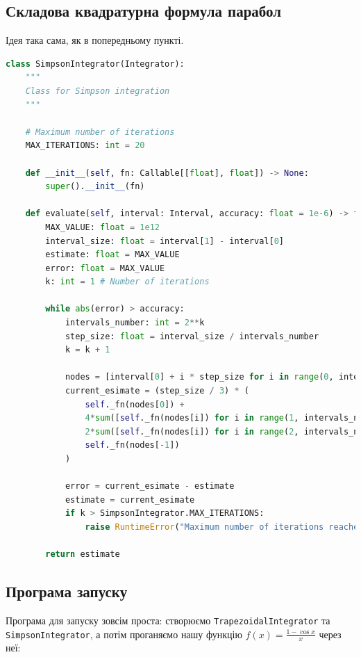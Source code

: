 \documentclass[12pt]{extarticle}
\begin{document}
\subsection{Складова квадратурна формула парабол}

Ідея така сама, як в попередньому пункті.
\begin{lstlisting}[language=Python, caption=Реалізація складової квадратурної формули парабол]
class SimpsonIntegrator(Integrator):
    """
    Class for Simpson integration
    """
    
    # Maximum number of iterations
    MAX_ITERATIONS: int = 20
    
    def __init__(self, fn: Callable[[float], float]) -> None:
        super().__init__(fn)
    
    def evaluate(self, interval: Interval, accuracy: float = 1e-6) -> float:
        MAX_VALUE: float = 1e12
        interval_size: float = interval[1] - interval[0]
        estimate: float = MAX_VALUE 
        error: float = MAX_VALUE
        k: int = 1 # Number of iterations
        
        while abs(error) > accuracy:
            intervals_number: int = 2**k
            step_size: float = interval_size / intervals_number
            k = k + 1
            
            nodes = [interval[0] + i * step_size for i in range(0, intervals_number+1)]
            current_esimate = (step_size / 3) * (
                self._fn(nodes[0]) + 
                4*sum([self._fn(nodes[i]) for i in range(1, intervals_number, 2)]) +
                2*sum([self._fn(nodes[i]) for i in range(2, intervals_number, 2)]) +
                self._fn(nodes[-1])
            )
            
            error = current_esimate - estimate
            estimate = current_esimate
            if k > SimpsonIntegrator.MAX_ITERATIONS:
                raise RuntimeError("Maximum number of iterations reached")
            
        return estimate
\end{lstlisting}

\subsection{Програма запуску}

Програма для запуску зовсім проста: створюємо \texttt{TrapezoidalIntegrator} та \texttt{SimpsonIntegrator}, а потім проганяємо нашу функцію $f(x) = \frac{1-\cos x}{x}$ через неї:
\end{document}
